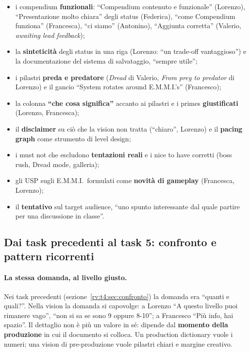 \begin{itemize}
  \item i compendium \textbf{funzionali}: ``Compendium contenuto e
        funzionale'' (Lorenzo), ``Presentazione molto chiara'' degli status
        (Federica), ``come Compendium funziona'' (Francesca), ``ci siamo''
        (Antonino), ``Aggiunta corretta'' (Valerio, \emph{awaiting lead
        feedback});
  \item la \textbf{sinteticità} degli status in una riga (Lorenzo: ``un
        trade-off vantaggioso'') e la documentazione del sistema di
        salvataggio, ``sempre utile'';
  \item i pilastri \textbf{preda e predatore} (\emph{Dread} di Valerio,
        \emph{From prey to predator} di Lorenzo) e il gancio ``System rotates
        around E.M.M.I.'s'' (Francesco);
  \item la colonna \textbf{``che cosa significa''} accanto ai pilastri e i
        primes \textbf{giustificati} (Lorenzo, Francesca);
  \item il \textbf{disclaimer} su ciò che la vision non tratta (``chiaro'',
        Lorenzo) e il \textbf{pacing graph} come strumento di level design;
  \item i must not che escludono \textbf{tentazioni reali} e i nice to have
        corretti (boss rush, Dread mode, galleria);
  \item gli USP sugli E.M.M.I.\ formulati come \textbf{novità di gameplay}
        (Francesca, Lorenzo);
  \item il \textbf{tentativo} sul target audience, ``uno spunto interessante
        dal quale partire per una discussione in classe''.
\end{itemize}

\subsection{Dai task precedenti al task 5: confronto e pattern ricorrenti}
\label{rv:t5:sec:confronto}

\paragraph{La stessa domanda, al livello giusto.} Nei task precedenti
(sezione~\ref{rv:t4:sec:confronto}) la domanda era ``quanti e quali?''. Nella
vision la domanda si capovolge: a Lorenzo ``A questo livello puoi rimanere
vago'', ``non si sa se sono 9 oppure 8-10''; a Francesco ``Più info, hai
spazio''. Il dettaglio non è più un valore in sé: dipende dal
\textbf{momento della produzione} in cui il documento si colloca. Un
production dictionary vuole i numeri; una vision di pre-produzione vuole
pilastri chiari e margine creativo.

